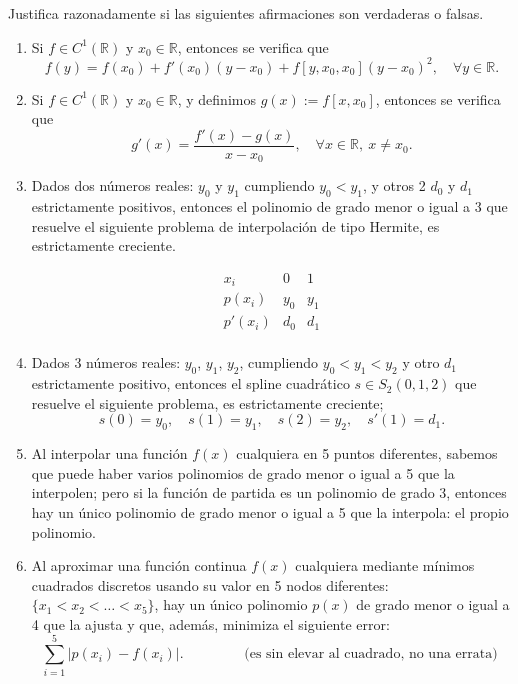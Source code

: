 \documentclass[12pt]{article}
\begin{document}
	\begin{ejercicio}[4 puntos]
		Justifica razonadamente si las siguientes afirmaciones son verdaderas o falsas.
		\begin{enumerate}[label=\alph*)]
			\item Si $f \in C^1(\mathbb{R})$ y $x_0 \in \mathbb{R}$, entonces se verifica que
			$$ f(y) = f(x_0) + f'(x_0)(y - x_0) + f[y, x_0, x_0](y - x_0)^2, \quad \forall y \in \mathbb{R}.$$
			
			\item Si $f \in C^1(\mathbb{R})$ y $x_0 \in \mathbb{R}$, y definimos $g(x) := f[x, x_0]$, entonces se verifica que
			$$ g'(x) = \frac{f'(x) - g(x)}{x - x_0}, \quad \forall x \in \mathbb{R}, \ x \ne x_0.$$
			
			\item Dados dos números reales: $y_0$ y  $y_1$ cumpliendo $y_0 < y_1$, y otros 2 $d_0$ y $d_1$ estrictamente positivos, entonces el polinomio de grado menor o igual a 3 que resuelve el siguiente problema de interpolación de tipo Hermite, es estrictamente creciente.
			
			$$ \begin{array}{c|c|c}
				x_i & 0 & 1 \\
				\hline
				p(x_i) & y_0 & y_1 \\
				\hline
				p'(x_i) & d_0 & d_1 \\
			\end{array} $$
			
			\item Dados 3 números reales: $y_0$, $y_1$, $y_2$, cumpliendo $y_0 < y_1 < y_2$ y otro $d_1$ estrictamente positivo, entonces el spline cuadrático $s \in S_2(0,1,2)$ que resuelve el siguiente problema, es estrictamente creciente;
			$$ s(0) = y_0, \quad s(1) = y_1, \quad s(2) = y_2, \quad s'(1) = d_1.$$
			
			\item Al interpolar una función $f(x)$ cualquiera en 5 puntos diferentes, sabemos que puede haber varios polinomios de grado menor o igual a 5 que la interpolen; pero si la función de partida es un polinomio de grado 3, entonces hay un único polinomio de grado menor o igual a 5 que la interpola: el propio polinomio.
			
			\item Al aproximar una función continua $f(x)$ cualquiera mediante mínimos cuadrados discretos usando su valor en 5 nodos diferentes: $\{x_1 < x_2 < \dots < x_5\}$, hay un único polinomio $ p(x)$ de grado menor o igual a 4 que la ajusta y que, además, minimiza el siguiente error:
			$$\sum_{i=1}^{5} |p(x_i) - f(x_i)|.\qquad \qquad \text{ (es sin elevar al cuadrado, no una errata) }$$
			
		\end{enumerate}
	\end{ejercicio}
	
\end{document}
